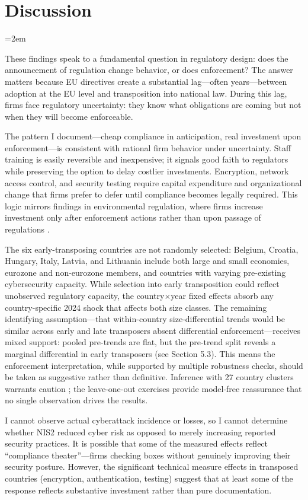 \documentclass[12pt]{article}
\begin{document}
\section{Discussion}
\emergencystretch=2em

These findings speak to a fundamental question in regulatory design: does the announcement of regulation change behavior, or does enforcement? The answer matters because EU directives create a substantial lag---often years---between adoption at the EU level and transposition into national law. During this lag, firms face regulatory uncertainty: they know what obligations are coming but not when they will become enforceable.

The pattern I document---cheap compliance in anticipation, real investment upon enforcement---is consistent with rational firm behavior under uncertainty. Staff training is easily reversible and inexpensive; it signals good faith to regulators while preserving the option to delay costlier investments. Encryption, network access control, and security testing require capital expenditure and organizational change that firms prefer to defer until compliance becomes legally required. This logic mirrors findings in environmental regulation, where firms increase investment only after enforcement actions rather than upon passage of regulations \citep{shimshack2014enforcement,gray2005effectiveness}.

The six early-transposing countries are not randomly selected: Belgium, Croatia, Hungary, Italy, Latvia, and Lithuania include both large and small economies, eurozone and non-eurozone members, and countries with varying pre-existing cybersecurity capacity. While selection into early transposition could reflect unobserved regulatory capacity, the country$\times$year fixed effects absorb any country-specific 2024 shock that affects both size classes. The remaining identifying assumption---that within-country size-differential trends would be similar across early and late transposers absent differential enforcement---receives mixed support: pooled pre-trends are flat, but the pre-trend split reveals a marginal differential in early transposers (see Section 5.3). This means the enforcement interpretation, while supported by multiple robustness checks, should be taken as suggestive rather than definitive. Inference with 27 country clusters warrants caution \citep{cameron2008bootstrap}; the leave-one-out exercises provide model-free reassurance that no single observation drives the results.

I cannot observe actual cyberattack incidence or losses, so I cannot determine whether NIS2 reduced cyber risk as opposed to merely increasing reported security practices. It is possible that some of the measured effects reflect ``compliance theater''---firms checking boxes without genuinely improving their security posture. However, the significant technical measure effects in transposed countries (encryption, authentication, testing) suggest that at least some of the response reflects substantive investment rather than pure documentation.
\end{document}
